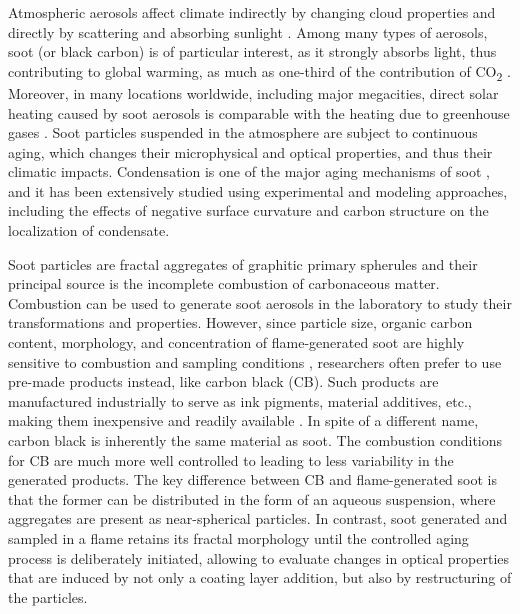 Atmospheric aerosols affect climate indirectly by changing cloud properties \citep{lohmann2005global,tao2012impact} and directly by scattering and absorbing sunlight \citep{chylek1995effect}. Among many types of aerosols, soot (or black carbon) is of particular interest, as it strongly absorbs light, thus contributing to global warming, as much as one-third of the contribution of CO\textsubscript{2} \citep{RN21}. Moreover, in many locations worldwide, including major megacities, direct solar heating caused by soot aerosols is comparable with the heating due to greenhouse gases \citep{RN45}. Soot particles suspended in the atmosphere are subject to continuous aging, which changes their microphysical and optical properties, and thus their climatic impacts. Condensation is one of the major aging mechanisms of soot \citep{saathoff2003coating}, and it has been extensively studied using experimental and modeling approaches, including the effects of negative surface curvature \citep{RN70,ivanova2020kinetic} and carbon structure \citep{ivanova2022molecular} on the localization of condensate.







Soot particles are fractal aggregates of graphitic primary spherules and their principal source is the incomplete combustion of carbonaceous matter. Combustion can be used to generate soot aerosols in the laboratory to study their transformations and properties. However, since particle size, organic carbon content, morphology, and concentration of flame-generated soot are highly sensitive to combustion and sampling conditions \citep{RN46,RN47}, researchers often prefer to use pre-made products instead, like carbon black (CB). Such products are manufactured industrially to serve as ink pigments, material additives, etc., making them inexpensive and readily available \citep{RN12}. In spite of a different name, carbon black is inherently the same material as soot. The combustion conditions for CB are much more well controlled to leading to less variability in the generated products. The key difference between CB and flame-generated soot is that the former can be distributed in the form of an aqueous suspension, where aggregates are present as near-spherical particles. In contrast, soot generated and sampled in a flame retains its fractal morphology until the controlled aging process is deliberately initiated, allowing to evaluate changes in optical properties that are induced by not only a coating layer addition, but also by restructuring of the particles.

